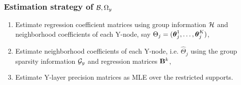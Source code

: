 \documentclass[10pt]{beamer}
\theoremstyle{definition}
\DeclareMathOperator*{\Tr}{Tr}
\DeclareMathOperator*{\argmin}{argmin}
\DeclareMathOperator*{\supp}{\text{supp}}
\begin{document}


\begin{frame}
\frametitle{Estimation strategy of ${\cal{B}}, \Omega_y$}

\begin{enumerate}
\item Estimate regression coefficient matrices using group information ${\cal{H}}$ and neighborhood coefficients of each Y-node, say $\Theta_j = ({\boldsymbol{\theta}}_j^1, \ldots, {\boldsymbol{\theta}}_j^K)$,
\vspace{1em}
\item Estimate neighborhood coefficients of each Y-node, i.e. $\widehat \Theta_j$ using the group sparsity information ${\cal{G}}_y$ and regression matrices ${\mathbf{B}}^k$,
\vspace{1em}
\item Estimate Y-layer precision matrices as MLE over the restricted supports.
\end{enumerate}

\end{frame}
\end{document}
